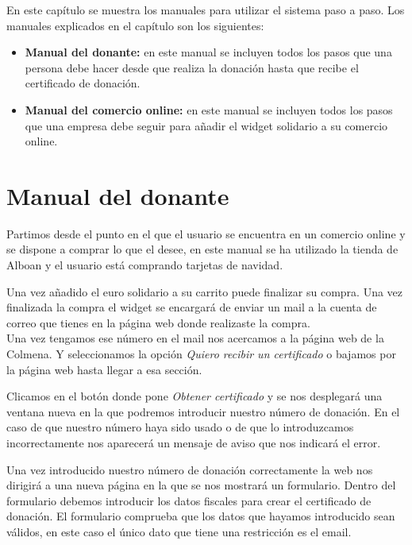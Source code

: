 En este capítulo se muestra los manuales para utilizar el sistema paso a paso. Los manuales explicados en el capítulo son los siguientes:

\begin{itemize}
	\item \textbf{Manual del donante:} en este manual se incluyen todos los pasos que una persona debe hacer desde que realiza la donación hasta que recibe el certificado de donación.
	\item \textbf{Manual del comercio online:} en este manual se incluyen todos los pasos que una empresa debe seguir para añadir el widget solidario a su comercio online.
\end{itemize}

\section{Manual del donante}
Partimos desde el punto en el que el usuario se encuentra en un comercio online y se dispone a comprar lo que el desee, en este manual se ha utilizado la tienda de Alboan y el usuario está comprando tarjetas de navidad.


Una vez añadido el euro solidario a su carrito puede finalizar su compra. Una vez finalizada la compra el widget se encargará de enviar un mail a la cuenta de correo que tienes en la página web donde realizaste la compra. \\

Una vez tengamos ese número en el mail nos acercamos a la página web de la Colmena. Y seleccionamos la opción \textit{Quiero recibir un certificado} o bajamos por la página web hasta llegar a esa sección.\\


Clicamos en el botón donde pone \textit{Obtener certificado} y se nos desplegará una ventana nueva en la que podremos introducir nuestro número de donación. En el caso de que nuestro número haya sido usado o de que lo introduzcamos incorrectamente nos aparecerá un mensaje de aviso que nos indicará el error. \\


Una vez introducido nuestro número de donación correctamente la web nos dirigirá a una nueva página en la que se nos mostrará un formulario. Dentro del formulario debemos introducir los datos fiscales para crear el certificado de donación. El formulario comprueba que los datos que hayamos introducido sean válidos, en este caso el único dato que tiene una restricción es el email. \\

